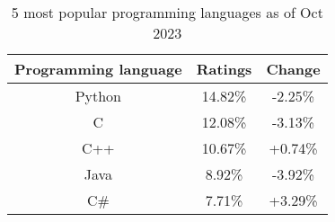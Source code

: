 \begin{table}[htbp]
\centering
\begin{tabular}{|c|c|c|}
\hline
\rowcolor[HTML]{C0C0C0} 
\textbf{Programming language} & \textbf{Ratings} & \textbf{Change} \\ \hline
Python                        & 14.82\%          & -2.25\%         \\ \hline
C                             & 12.08\%          & -3.13\%         \\ \hline
C++                           & 10.67\%          & +0.74\%         \\ \hline
Java                          & 8.92\%           & -3.92\%         \\ \hline
C\#                           & 7.71\%           & +3.29\%         \\ \hline
\end{tabular}
\label{tab:programming_languages_table}
\caption{5 most popular programming languages as of Oct 2023}
\end{table}